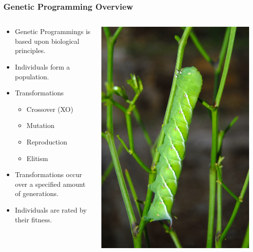 \documentclass{beamer}
\begin{document}
\begin{frame}
  \frametitle{Genetic Programming Overview}
  
  \begin{columns}
  \begin{column}{.65\textwidth}
  \begin{itemize}
  	\item Genetic Programmings is based upon biological principles.
	\item Individuals form a population.
	\item Transformations
		\begin{itemize}
		\item Crossover (XO)
		\item Mutation
		\item Reproduction
		\item Elitism
		\end{itemize}
	\item Transformations occur over a specified amount of generations.
	\item Individuals are rated by their fitness.
  \end{itemize}
  \end{column}
  \begin{column}{.35\textwidth}
    \includegraphics[width=.95\textwidth]{Illustrations/Manduca_sexta_by_Sam_Fraser-Smith_from_Flickr.jpg}

\end{column}
\end{columns}
\end{frame}
\end{document}
